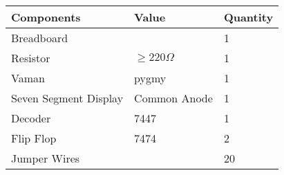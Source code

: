 \begin{tabular}{|p{4cm}|p{3cm}|p{3cm}|}
\hline                                        
\textbf{Components} & \textbf{Value} & \textbf{Quantity}\\                                          
\hline                                 
Breadboard &      & 1 \\           
\hline                                    
Resistor & $ \geq 220\Omega $ & 1 \\     
\hline                      
Vaman & pygmy & 1 \\       
\hline                                     
Seven Segment Display & Common Anode & 1\\
\hline                      
Decoder & 7447 & 1 \\        
\hline                     
Flip Flop & 7474 & 2 \\
\hline                        
Jumper Wires &    & 20\\   
	\hline
\end{tabular}


